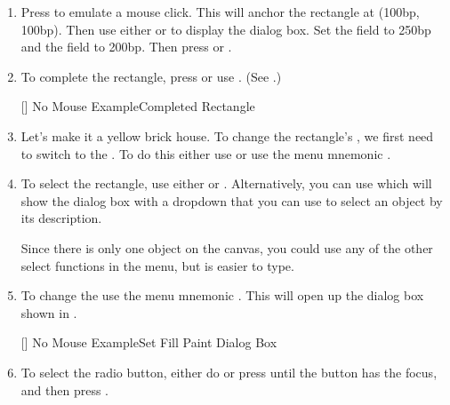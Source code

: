 \begin{enumerate}
[]
{}
{No Mouse Example\dash Go To Co-Ordinate Dialog Box}

\item Press  to emulate a mouse
click.  This will anchor the rectangle at (100bp, 100bp). Then use
either  or
 to display the  dialog
box. Set the  field to 250bp and the
 field to 200bp. Then press
 or .

\item To complete the rectangle, press 
or use .
(See .)

[]
{}
{No Mouse Example\dash Completed Rectangle}

\item Let's make it a yellow brick house. To change the rectangle's
, we first need to switch to the . To do this
either use  or use the menu mnemonic
.

\item To select the rectangle, use either
 or .
Alternatively, you can use  which
will show the  dialog box with a \gls{dropdown} that you can use to
select an object by its description.

\begin{information}
Since there is only one object on the canvas, you could use any of the other select
functions in the  menu, but
 is easier to type.
\end{information}

\item To change the  use the menu mnemonic
. This will open up
the  dialog box shown in .

[]
{}
{No Mouse Example\dash Set Fill Paint Dialog Box}

\item To select the  radio button,
either do  or press  until
the  button has the focus, and then
press .


\end{enumerate}
